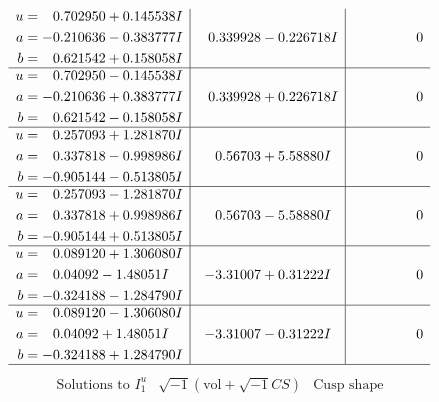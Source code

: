 \documentclass[1p]{elsarticle_modified}
\theoremstyle{definition}
\newcommand{\I}{\sqrt{-1}}
\begin{document}
$$\begin{array}{c|c|c}
\begin{aligned}
u &= \phantom{-}0.702950 + 0.145538 I \\
a &= -0.210636 - 0.383777 I \\
b &= \phantom{-}0.621542 + 0.158058 I\end{aligned}
 & \phantom{-}0.339928 - 0.226718 I & \phantom{-0.000000 } 0 \\ \hline\begin{aligned}
u &= \phantom{-}0.702950 - 0.145538 I \\
a &= -0.210636 + 0.383777 I \\
b &= \phantom{-}0.621542 - 0.158058 I\end{aligned}
 & \phantom{-}0.339928 + 0.226718 I & \phantom{-0.000000 } 0 \\ \hline\begin{aligned}
u &= \phantom{-}0.257093 + 1.281870 I \\
a &= \phantom{-}0.337818 - 0.998986 I \\
b &= -0.905144 - 0.513805 I\end{aligned}
 & \phantom{-}0.56703 + 5.58880 I & \phantom{-0.000000 } 0 \\ \hline\begin{aligned}
u &= \phantom{-}0.257093 - 1.281870 I \\
a &= \phantom{-}0.337818 + 0.998986 I \\
b &= -0.905144 + 0.513805 I\end{aligned}
 & \phantom{-}0.56703 - 5.58880 I & \phantom{-0.000000 } 0 \\ \hline\begin{aligned}
u &= \phantom{-}0.089120 + 1.306080 I \\
a &= \phantom{-}0.04092 - 1.48051 I \\
b &= -0.324188 - 1.284790 I\end{aligned}
 & -3.31007 + 0.31222 I & \phantom{-0.000000 } 0 \\ \hline\begin{aligned}
u &= \phantom{-}0.089120 - 1.306080 I \\
a &= \phantom{-}0.04092 + 1.48051 I \\
b &= -0.324188 + 1.284790 I\end{aligned}
 & -3.31007 - 0.31222 I & \phantom{-0.000000 } 0\\
 \hline 
 \end{array}$$\newpage$$\begin{array}{c|c|c}  
\text{Solutions to }I^u_{1}& \I (\text{vol} + \sqrt{-1}CS) & \text{Cusp shape}\\

\end{array}$$
\end{document}
